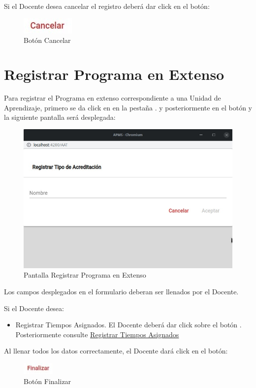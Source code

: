 Si el Docente desea cancelar el registro deberá dar click en el botón:

\begin{figure}[H]
    \centering
    \includegraphics[width=0.1\linewidth]{images/SP6/BotonCancelar.jpeg}
    \caption{Botón Cancelar}
\end{figure}
\pagebreak
\hypertarget{RegPE}{\section{Registrar Programa en Extenso}}

Para registrar el Programa en extenso correspondiente a una Unidad de Aprendizaje, primero se da click en en la pestaña . y posteriormente en el botón  y la siguiente pantalla será desplegada:

\begin{figure}[!h]
    \centering
    \hypertarget{RegPE}{\includegraphics[width=0.5\linewidth]{images/SP6/9.jpeg}}
    \caption{Pantalla Registrar Programa en Extenso}
\end{figure}

Los campos desplegados en el formulario deberan ser llenados por el Docente.

Si el Docente desea:

\begin{itemize}
    \item Registrar Tiempos Asignados. El Docente deberá dar click sobre el botón . Posteriormente consulte \hyperlink{RegTA}{Registrar Tiempos Asignados}
\end{itemize}

Al llenar todos los datos correctamente, el Docente dará click en el botón:

\begin{figure}[H]
    \centering
    \includegraphics[width=0.1\linewidth]{images/SP6/BotonFinalizar.jpeg}
    \caption{Botón Finalizar}
\end{figure}

